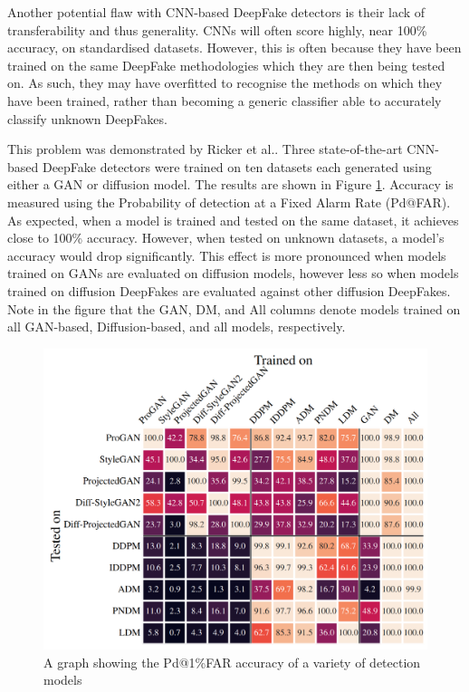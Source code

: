 Another potential flaw with CNN-based DeepFake detectors is their lack of transferability\cite{ricker2022towards} and thus generality. CNNs will often score highly, near 100\% accuracy, on standardised datasets. However, this is often because they have been trained on the same DeepFake methodologies which they are then being tested on. As such, they may have overfitted to recognise the methods on which they have been trained, rather than becoming a generic classifier able to accurately classify unknown DeepFakes.

This problem was demonstrated by Ricker et al.\cite{ricker2022towards}. Three state-of-the-art CNN-based DeepFake detectors were trained on ten datasets each generated using either a GAN or diffusion model. The results are shown in Figure \ref{fig:transferability}. Accuracy is measured using the Probability of detection at a Fixed Alarm Rate (Pd@FAR). As expected, when a model is trained and tested on the same dataset, it achieves close to 100\% accuracy. However, when tested on unknown datasets, a model's accuracy would drop significantly. This effect is more pronounced when models trained on GANs are evaluated on diffusion models, however less so when models trained on diffusion DeepFakes are evaluated against other diffusion DeepFakes. Note in the figure that the GAN, DM, and All columns denote models trained on all GAN-based, Diffusion-based, and all models, respectively.

\begin{figure}[H]
    \centering
    \includegraphics[width=0.75\linewidth]{dissertation//figures/transferability.png}
    \caption{A graph showing the Pd@1\%FAR accuracy of a variety of detection models\cite{ricker2022towards}}
    \label{fig:transferability}
\end{figure}

